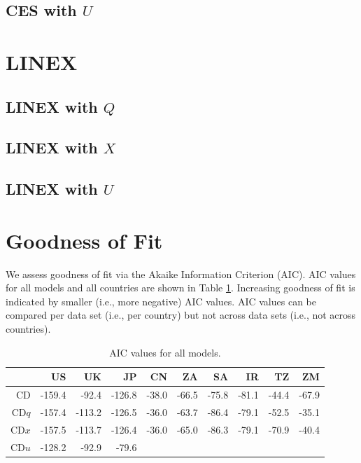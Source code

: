 \documentclass[preprint,authoryear,12pt]{elsarticle}\usepackage{graphicx, color}
\begin{document}
\subsection{CES with $U$}

\section{LINEX}

\subsection{LINEX with $Q$}

\subsection{LINEX with $X$}

\subsection{LINEX with $U$}

\section{Goodness of Fit}




We assess goodness of fit via the Akaike Information Criterion (AIC). AIC values for all models and all countries are shown in Table \ref{tab:AICTable}. Increasing goodness of fit is indicated by smaller (i.e., more negative) AIC values. AIC values can be compared per data set (i.e., per country) but not across data sets (i.e., not across countries). 

\begin{table}[ht]
\begin{center}
\caption{AIC values for all models.}
\label{tab:AICTable}
\begin{tabular}{rrrrrrrrrr}
  \hline
 & US & UK & JP & CN & ZA & SA & IR & TZ & ZM \\ 
  \hline
CD & -159.4 & -92.4 & -126.8 & -38.0 & -66.5 & -75.8 & -81.1 & -44.4 & -67.9 \\ 
  CD$q$ & -157.4 & -113.2 & -126.5 & -36.0 & -63.7 & -86.4 & -79.1 & -52.5 & -35.1 \\ 
  CD$x$ & -157.5 & -113.7 & -126.4 & -36.0 & -65.0 & -86.3 & -79.1 & -70.9 & -40.4 \\ 
  CD$u$ & -128.2 & -92.9 & -79.6 &  &  &  &  &  &  \\ 
   \hline
\end{tabular}
\end{center}
\end{table}
\end{document}
